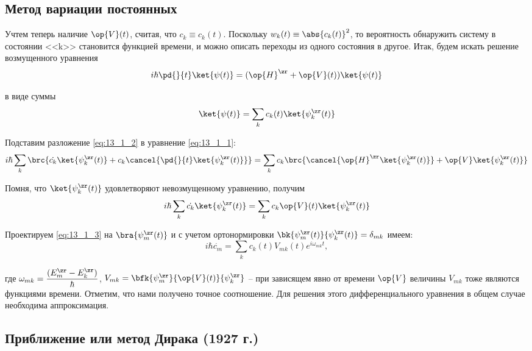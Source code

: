 \subsection{Метод вариации постоянных}

Учтем теперь наличие $\op{V}(t)$, считая, что $c_k \equiv c_k(t)$. Поскольку $w_k(t) \equiv \abs{c_k(t)}^2$, то вероятность обнаружить систему в состоянии <<k>> становится функцией времени, и можно описать переходы из одного состояния в другое. Итак, будем искать решение возмущенного уравнения
\begin{equation}
\label{eq:13_1_1}
i \hbar \pd{}{t} \ket{\psi(t)} = (\op{H}^\zr + \op{V}(t)) \ket{\psi(t)}
\end{equation}

в виде суммы
\begin{equation}
\label{eq:13_1_2}
\ket{\psi(t)} = \sum_k c_k(t) \ket{\psi_k^\zr(t)}
\end{equation}

Подставим разложение \eqref{eq:13_1_2} в уравнение \eqref{eq:13_1_1}:
$$
i \hbar \sum_k \brc{\dot{c_k} \ket{\psi_k^\zr (t) } + c_k \cancel{\pd{}{t} \ket{\psi_k^\zr (t)}}} = \sum_k c_k \brc{ \cancel{\op{H}^\zr \ket{\psi_k^\zr(t)}} + \op{V} \ket{\psi_k^\zr(t)}}
$$

Помня, что $\ket{\psi_k^\zr(t)}$ удовлетворяют невозмущенному уравнению, получим
\begin{equation}
\label{eq:13_1_3}
i \hbar \sum_k \dot{c_k} \ket{\psi_k^\zr (t)} = \sum_k c_k \op{V}(t) \ket{\psi_k^\zr(t)}
\end{equation}

Проектируем \eqref{eq:13_1_3} на $\bra{\psi_m^\zr(t)}$ и с учетом ортонормировки $\bk{\psi_m^\zr(t)}{\psi_k^\zr(t)} = \delta_{mk}$ имеем:
\begin{equation}
\label{eq:13_1_4}
\boxed{i\hbar \dot{c_m} = \sum_k c_k (t) V_{mk}(t) e^{i \omega_{mk} t}},
\end{equation}

где $\omega_{mk} = \dfrac{(E_m^\zr - E_k^\zr)}{\hbar}$, $V_{mk} = \bfk{\psi_m^\zr}{\op{V}(t)}{\psi_k^\zr}$ -- при зависящем явно от времени $\op{V}$ величины $V_{mk}$ тоже являются функциями времени. Отметим, что нами получено точное соотношение. Для решения этого дифференциального уравнения в общем случае необходима аппроксимация. 

\subsection{Приближение или метод Дирака (1927 г.)}

